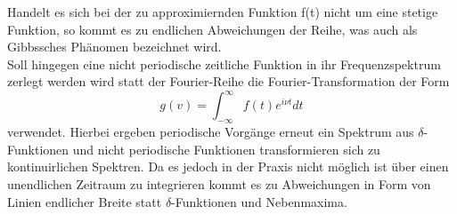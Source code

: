 Handelt es sich bei der zu approximiernden Funktion f(t) nicht um eine
stetige Funktion, so kommt es zu endlichen Abweichungen der Reihe,
was auch als Gibbssches Phänomen bezeichnet wird. \\
Soll hingegen eine nicht periodische zeitliche Funktion in ihr
Frequenzspektrum zerlegt werden wird statt der Fourier-Reihe die
Fourier-Transformation der Form
\begin{equation}
  g(v) = \int_{-\infty}^{\infty} f(t)e^{i\nu t} dt
\end{equation}
verwendet. Hierbei ergeben periodische Vorgänge erneut ein Spektrum aus
$\delta$-Funktionen und nicht periodische Funktionen transformieren sich zu
kontinuirlichen
Spektren. Da es jedoch in der Praxis nicht möglich ist über einen unendlichen
Zeitraum zu integrieren kommt es zu Abweichungen in Form von Linien endlicher
Breite statt $\delta$-Funktionen und Nebenmaxima.
